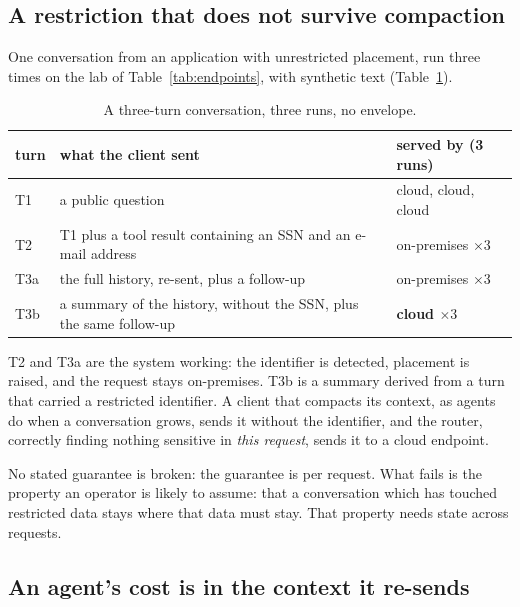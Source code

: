 \documentclass[11pt]{article}
\begin{document}
\subsection{A restriction that does not survive compaction}
\label{sec:compaction}

One conversation from an application with unrestricted placement, run three times on the lab of
Table~\ref{tab:endpoints}, with synthetic text (Table~\ref{tab:compaction}).

\begin{table}[t]
\centering
\small
\caption{A three-turn conversation, three runs, no envelope.}
\label{tab:compaction}
\begin{tabular}{@{}lp{8.2cm}l@{}}
\toprule
turn & what the client sent & served by (3 runs) \\
\midrule
T1 & a public question & cloud, cloud, cloud \\
T2 & T1 plus a tool result containing an SSN and an e-mail address & on-premises $\times 3$ \\
T3a & the full history, re-sent, plus a follow-up & on-premises $\times 3$ \\
T3b & a summary of the history, without the SSN, plus the same follow-up & \textbf{cloud $\times 3$} \\
\bottomrule
\end{tabular}
\end{table}

T2 and T3a are the system working: the identifier is detected, placement is raised, and the
request stays on-premises. T3b is a summary derived from a turn that carried a restricted
identifier. A client that compacts its context, as agents do when a conversation grows, sends it
without the identifier, and the router, correctly finding nothing sensitive in \emph{this
request}, sends it to a cloud endpoint.

No stated guarantee is broken: the guarantee is per request. What fails is the property an
operator is likely to assume: that a conversation which has touched restricted data stays where
that data must stay. That property needs state across requests.

\subsection{An agent's cost is in the context it re-sends}
\label{sec:resend}
\end{document}
